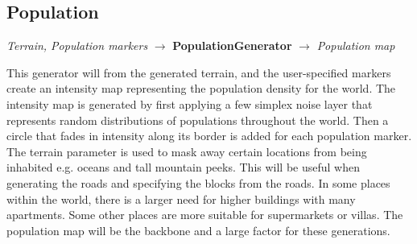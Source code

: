 \subsection{Population}
\begin{center}
    \textit{Terrain, Population markers} $\rightarrow$ \textbf{PopulationGenerator} $\rightarrow$ \textit{Population map} 
\end{center}
This generator will from the generated terrain, and the user-specified markers create an intensity map representing the population density for the world.
The intensity map is generated by first applying a few simplex noise layer that represents random distributions of populations throughout the world. 
Then a circle that fades in intensity along its border is added for each population marker. 
The terrain parameter is used to mask away certain locations from being inhabited e.g. oceans and tall mountain peeks.
This will be useful when generating the roads and specifying the blocks from the roads. 
In some places within the world, there is a larger need for higher buildings with many apartments. 
Some other places are more suitable for supermarkets or villas. 
The population map will be the backbone and a large factor for these generations. 

